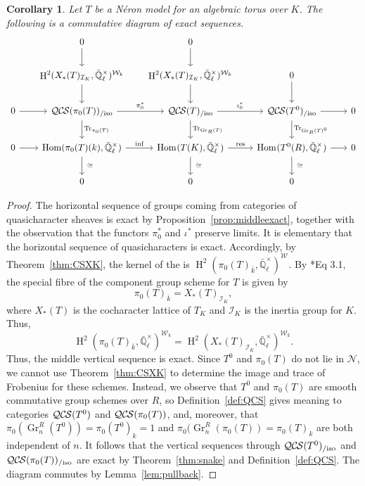 \documentclass[10pt]{amsart}
\theoremstyle{plain}
\newtheorem{corollary}[theorem]{Corollary}
\theoremstyle{definition}
\newcommand{\EE}{\mathbb{\bar Q}_\ell}
\newcommand{\bFq}{\bar{k}}
\newcommand{\Fq}{k}
\newcommand{\EEx}{\EE^\times}
\newcommand{\Weil}[1]{\mathcal{W}_{#1}}
\DeclareMathOperator{\Hom}{Hom}
\DeclareMathOperator{\Gr}{Gr}
\DeclareMathOperator{\Hh}{H}
\newcommand{\iso}{{\ \cong\ }}
\newcommand{\TrFrob}[1]{\operatorname{Tr}_{#1}}
\newcommand{\QCS}{{\mathcal{QC\hskip-0.8pt S}}}
\newcommand{\QCSiso}[1]{\QCS(#1)_{/\text{iso}}}
\begin{document}
\begin{corollary}\label{cor:CS_tori}
Let $T$ be a N\'eron model for an algebraic torus over $K$.
The following is a commutative diagram of exact sequences.
\[
  \begin{tikzcd}[row sep=20, column sep=18]
{}  & 0 \arrow{d} & 0 \arrow{d} &  & \\ 
   & \Hh^2(X_*(T)_{\mathcal{I}_K},\EEx)^{\Weil{\Fq}}  \arrow{d} & \arrow{d} \Hh^2(X_*(T)_{\mathcal{I}_K},\EEx)^{\Weil{\Fq}} & 0 \arrow{d} & \\
    0 \rar & \QCSiso{\pi_0(T)} \arrow{r}{\pi_0^*} \dar{\TrFrob{\pi_0(T)}}
    & \QCSiso{T} \arrow{r}{\iota_0^*}  \arrow{d}{\TrFrob{\Gr_R(T)}} & \QCSiso{T^0} \arrow{r} \arrow{d}{\TrFrob{\Gr_R(T)^0}} & 0\\
    0 \arrow{r} & \Hom(\pi_0(T)(\Fq), \EEx) \arrow{r}{\text{inf}} \arrow{d}{\iso}
    & \arrow{d}{\iso} \Hom_\text{}(T(K),\EEx) \arrow{r}{\text{res}} & \Hom_\text{}(T^0(R),\EEx) \arrow{r} \arrow{d}{\iso} & 0\\
 &  0  & 0 & 0 & 
  \end{tikzcd}
 \]
 \end{corollary}
\begin{proof} 
The horizontal sequence of groups coming from categories of quasicharacter sheaves is exact by
Proposition~\ref{prop:middleexact}, together with the observation that the functors $\pi_0^*$ and $\iota^*$ preserve limits.
It is elementary that the horizontal sequence of quasicharacters is exact.
Accordingly, by Theorem~\ref{thm:CSXK}, the kernel of the  is $\Hh^2(\pi_0(T)_{\bFq},\EEx)^{\Weil{}}$. 
By \cite{bitan:discriminant}*{Eq 3.1}, the special fibre of the component group scheme for $T$ is given by
\[
 \pi_0(T)_{\bFq} = X_*(T)_{\mathcal{I}_K},
\]
where $X_*(T)$ is the cocharacter lattice of $T_K$ and $\mathcal{I}_K$ is the inertia group for $K$.
Thus,
\[
\Hh^2(\pi_0(T)_{\bFq},\EEx)^{\Weil{\Fq}} = \Hh^2(X_*(T)_{\mathcal{I}_K},\EEx)^{\Weil{\Fq}}.
\] 
Thus, the middle vertical sequence is exact.
Since $T^0$ and $\pi_0(T)$ do not lie in $\mathcal{N}$, we cannot use Theorem~\ref{thm:CSXK} to
determine the image and trace of Frobenius for these schemes. 
Instead, we observe that $T^0$ and $\pi_0(T)$ are smooth commutative group schemes over $R$,
so Definition~\ref{def:QCS} gives meaning to categories $\QCS(T^0)$ and $\QCS(\pi_0(T))$, and,
moreover, that $\pi_0(\Gr^R_n(T^0))= \pi_0(T^0)_{\Fq} = 1$ and $\pi_0(\Gr^R_n(\pi_0(T)) = \pi_0(T)_{\Fq}$ are both independent of $n$.
It follows that the vertical sequences through $\QCSiso{T^0}$ and $\QCSiso{\pi_0(T)}$ are exact by
Theorem~\ref{thm:snake} and Definition~\ref{def:QCS}.
The diagram commutes by Lemma~\ref{lem:pullback}.
\end{proof}
\end{document}
